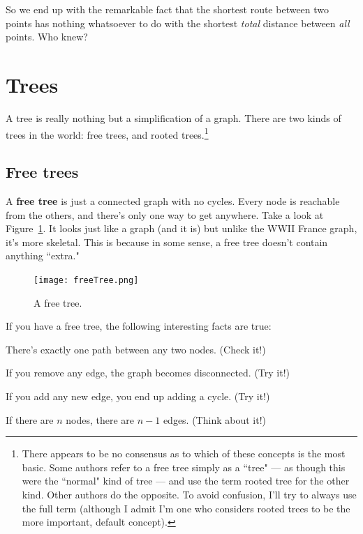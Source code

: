 So we end up with the remarkable fact that the shortest route between two
points has nothing whatsoever to do with the shortest \textit{total}
distance between \textit{all} points. Who knew?






\section{Trees}

A tree is really nothing but a simplification of a graph. There are two
kinds of trees in the world: free trees, and rooted trees.\footnote{There
appears to be no consensus as to which of these concepts is the most basic.
Some authors refer to a free tree simply as a ``tree" --- as though this
were the ``normal" kind of tree --- and use the term rooted tree for the
other kind. Other authors do the opposite. To avoid confusion, I'll try to
always use the full term (although I admit I'm one who considers rooted
trees to be the more important, default concept).}

\subsection{Free trees}

A \textbf{free tree} is just a connected graph with no cycles. Every node
is reachable from the others, and there's only one way to get anywhere.
Take a look at Figure~\ref{freetree}. It looks just like a graph (and it
is) but unlike the WWII France graph, it's more skeletal. This is because
in some sense, a free tree doesn't contain anything ``extra."

\begin{figure}[ht]
\centering
\begin{custommargins}{-2.1cm}{-3cm}
\texttt{[image: freeTree.png]}
\caption{A free tree.}
\label{freetree}
\end{custommargins}
\end{figure}

If you have a free tree, the following interesting facts are true:

\begin{compactenum}
\item There's exactly one path between any two nodes. (Check it!)
\item If you remove any edge, the graph becomes disconnected. (Try it!)
\item If you add any new edge, you end up adding a cycle. (Try it!)
\item \label{onelessedge} If there are $n$ nodes, there are $n-1$ edges. (Think about it!)
\end{compactenum}

